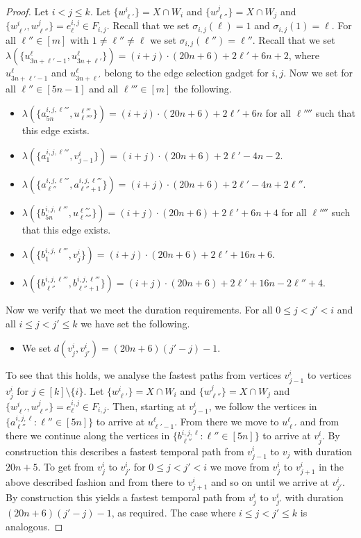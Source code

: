 \documentclass[a4paper,UKenglish,cleveref, autoref, thm-restate, anonymous]{lipics-v2021}
\begin{document}
\begin{proof}
Let $i<j\le k$. 
Let $\{w^i_{\ell'}\}=X\cap W_i$ and $\{w^j_{\ell''}\}=X\cap W_j$ and $\{w^i_{\ell'},w^j_{\ell''}\}=e^{i,j}_\ell\in F_{i,j}$. 
Recall that we set $\sigma_{i,j}(\ell)=1$ and $\sigma_{i,j}(1)=\ell$. For all $\ell''\in[m]$ with $1\neq\ell''\neq\ell$ we set $\sigma_{i,j}(\ell'')=\ell''$.
Recall that we set $\lambda(\{u^{\ell}_{3n+\ell'-1},u^{\ell}_{3n+\ell'}\})=(i+j)\cdot (20n+6)+2\ell'+6n+2$, where $u^{\ell}_{3n+\ell'-1}$ and $u^{\ell}_{3n+\ell'}$ belong to the edge selection gadget for $i,j$.
Now we set for all $\ell''\in[5n-1]$ and all $\ell'''\in[m]$ the following.
\begin{itemize}
    \item $\lambda(\{a^{i,j,\ell'''}_{5n},u^{\ell'''}_{\ell''''}\})=(i+j)\cdot (20n+6)+2\ell'+6n$ for all $\ell''''$ such that this edge exists.
    \item $\lambda(\{a^{i,j,\ell'''}_{1},v^i_{j-1}\})=(i+j)\cdot (20n+6)+2\ell'-4n-2$.
    \item $\lambda(\{a^{i,j,\ell'''}_{\ell''},a^{i,j,\ell'''}_{\ell''+1}\})=(i+j)\cdot (20n+6)+2\ell'-4n+2\ell''$.
    \item $\lambda(\{b^{i,j,\ell'''}_{5n},u^{\ell'''}_{\ell''''}\})=(i+j)\cdot (20n+6)+2\ell'+6n+4$ for all $\ell''''$ such that this edge exists.
    \item $\lambda(\{b^{i,j,\ell'''}_{1},v^i_{j}\})=(i+j)\cdot (20n+6)+2\ell'+16n+6$.
    \item $\lambda(\{b^{i,j,\ell'''}_{\ell''},b^{i,j,\ell'''}_{\ell''+1}\})=(i+j)\cdot (20n+6)+2\ell'+16n-2\ell''+4$.
\end{itemize}

Now we verify that we meet the duration requirements.
For all $0\le j<j'<i$ and all $i\le j<j'\le k$ we have set the following.
\begin{itemize}
    \item We set $d(v^i_j,v^i_{j'})=(20n+6)(j'-j)-1$.
\end{itemize}
To see that this holds, we analyse the fastest paths from vertices $v^i_{j-1}$ to vertices $v^i_j$ for $j\in[k]\setminus\{i\}$. 
Let $\{w^i_{\ell'}\}=X\cap W_i$ and $\{w^j_{\ell''}\}=X\cap W_j$ and $\{w^i_{\ell'},w^j_{\ell''}\}=e^{i,j}_\ell\in F_{i,j}$. Then, starting at $v^i_{j-1}$, we follow the vertices in $\{a^{i,j,\ell}_{\ell''} :  \ell''\in[5n]\}$ to arrive at $u^{\ell}_{\ell'-1}$. From there we move to $u^{\ell}_{\ell'}$ and from there we continue along the vertices in $\{b^{i,j,\ell}_{\ell''} :  \ell''\in[5n]\}$ to arrive at $v^i_j$. By construction this describes a fastest temporal path from $v^i_{j-1}$ to $v_j$ with duration $20n+5$.
To get from $v^i_j$ to $v^i_{j'}$ for $0\le j<j'<i$ we move from $v^i_j$ to $v^i_{j+1}$ in the above described fashion and from there to $v^i_{j+1}$ and so on until we arrive at $v^i_{j'}$. By construction this yields a fastest temporal path from $v^i_j$ to $v^i_{j'}$ with duration $(20n+6)(j'-j)-1$, as required.
The case where $i\le j<j'\le k$ is analogous.


\end{proof}
\end{document}
